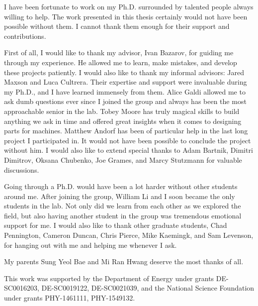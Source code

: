 \begin{acknowledgements}

I have been fortunate to work on my Ph.D. surrounded by talented people always willing to help.
The work presented in this thesis certainly would not have been possible without them.
I cannot thank them enough for their support and contributions.

First of all, I would like to thank my advisor, Ivan Bazarov, for guiding me through my experience.
He allowed me to learn, make mistakes, and develop these projects patiently.
I would also like to thank my informal advisors: Jared Maxson and Luca Cultrera. Their expertise and support were invaluable during my Ph.D., and I have learned immensely from them.
Alice Galdi allowed me to ask dumb questions ever since I joined the group and always has been the most approachable senior in the lab.
Tobey Moore has truly magical skills to build anything we ask in time and offered great insights when it comes to designing parts for machines.
Matthew Andorf has been of particular help in the last long project I participated in. It would not have been possible to conclude the project without him.
I would also like to extend special thanks to Adam Bartnik, Dimitri Dimitrov, Oksana Chubenko, Joe Grames, and Marcy Stutzmann for valuable discussions.

Going through a Ph.D. would have been a lot harder without other students around me. After joining the group, William Li and I soon became the only students in the lab. Not only did we learn from each other as we explored the field, but also having another student in the group was tremendous emotional support for me.
I would also like to thank other graduate students, Chad Pennington, Cameron Duncan, Chris Pierce, Mike Kaemingk, and Sam Levenson, for hanging out with me and helping me whenever I ask.

My parents Sung Yeol Bae and Mi Ran Hwang deserve the most thanks of all.

This work was supported by the Department of Energy under grants DE-SC0016203, DE-SC0019122, DE-SC0021039, and the National Science Foundation under grants PHY-1461111, PHY-1549132.

\end{acknowledgements}
